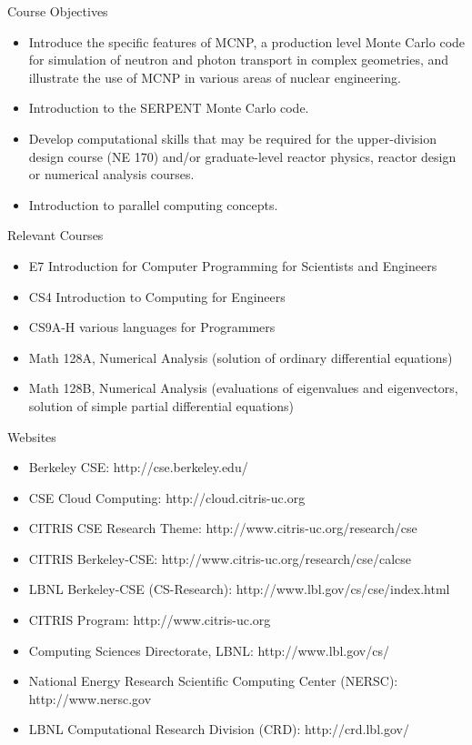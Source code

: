 \documentclass[xcolor=x11names,compress]{beamer}
\renewcommand{\(}{\begin{columns}}
\renewcommand{\)}{\end{columns}}
\newcommand{\<}[1]{\begin{column}{#1}}
\renewcommand{\>}{\end{column}}
\begin{document}
\begin{frame}{Course Objectives}
\begin{itemize}
\item Introduce the specific features of MCNP, a production level Monte Carlo code for simulation of neutron and photon transport in complex geometries, and illustrate the use of MCNP in various areas of nuclear engineering.
\item Introduction to the SERPENT Monte Carlo code.
\item Develop computational skills that may be required for the upper-division design course (NE 170) and/or graduate-level reactor physics, reactor design or numerical analysis courses.
\item Introduction to parallel computing concepts.
\end{itemize}
\end{frame}

\begin{frame}{Relevant Courses}
\begin{itemize}
\item E7 Introduction for Computer Programming for Scientists and Engineers
\item CS4 Introduction to Computing for Engineers
\item CS9A-H various languages for Programmers
\item Math 128A, Numerical Analysis (solution of ordinary differential equations)
\item Math 128B, Numerical Analysis (evaluations of eigenvalues and eigenvectors, solution of simple partial differential equations)
\end{itemize}
\end{frame}

\begin{frame}{Websites}
\begin{itemize}
\item Berkeley CSE: http://cse.berkeley.edu/
\item CSE Cloud Computing: http://cloud.citris-uc.org
\item CITRIS CSE Research Theme: http://www.citris-uc.org/research/cse
\item CITRIS Berkeley-CSE: http://www.citris-uc.org/research/cse/calcse	
\item LBNL Berkeley-CSE (CS-Research):  http://www.lbl.gov/cs/cse/index.html
\item CITRIS Program: http://www.citris-uc.org
\item Computing Sciences Directorate, LBNL: http://www.lbl.gov/cs/
\item National Energy Research Scientific Computing Center (NERSC): http://www.nersc.gov	
\item LBNL Computational Research Division (CRD): http://crd.lbl.gov/
\end{itemize}
\end{frame}
\end{document}
